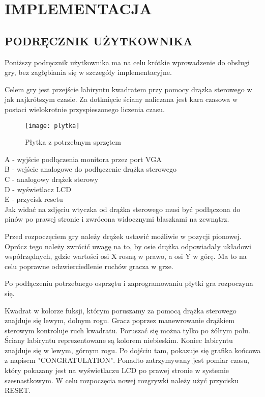 \documentclass[11pt]{article}
\begin{document}
\section{IMPLEMENTACJA}

\subsection{PODRĘCZNIK UŻYTKOWNIKA}

Poniższy podręcznik użytkownika ma na celu krótkie wprowadzenie do obsługi gry, bez zagłębiania się w szczegóły implementacyjne.

Celem gry jest przejście labiryntu kwadratem przy pomocy drązka sterowego w jak najkrótszym czasie. Za dotknięcie ściany naliczana jest kara czasowa w postaci wielokrotnie przyspieszonego liczenia czasu.

\begin{figure}
\centering
\texttt{[image: plytka]}
\caption{Płytka z potrzebnym sprzętem}
\end{figure}

A - wyjście podłączenia monitora przez port VGA \\
B - wejście analogowe do podłączenie drążka sterowego \\
C - analogowy drążek sterowy \\
D - wyświetlacz LCD \\
E - przycisk resetu \\

Jak widać na zdjęciu wtyczka od drążka sterowego musi być podłączona do pinów po prawej stronie i zwrócona widocznymi blaszkami na zewnątrz.

Przed rozpoczęciem gry należy drążek ustawić możliwie w pozycji pionowej.
Oprócz tego należy zwrócić uwagę na to, by osie drążka odpowiadały układowi współrzędnych, gdzie wartości osi X rosną w prawo, a osi Y w górę.
Ma to na celu poprawne odzwierciedlenie ruchów gracza w grze. 
%

Po podłączeniu potrzebnego osprzętu i zaprogramowaniu płytki gra rozpoczyna się. 

Kwadrat w kolorze fuksji, którym poruszamy za pomocą drążka sterowego znajduje się lewym, dolnym rogu.
Gracz poprzez manewrowanie drążkiem sterowym kontroluje ruch kwadratu.
Poruszać się można tylko po żółtym polu. Ściany labiryntu reprezentowane są kolorem niebieskim.
Koniec labiryntu znajduje się w lewym, górnym rogu.
Po dojściu tam, pokazuje się grafika końcowa z napisem "CONGRATULATION". %
Ponadto zatrzymywany jest pomiar czasu, który pokazany jest na wyświetlaczu LCD po prawej stronie w systemie szesnastkowym.
W celu rozpoczęcia nowej rozgrywki należy użyć przycisku RESET.
\end{document}
